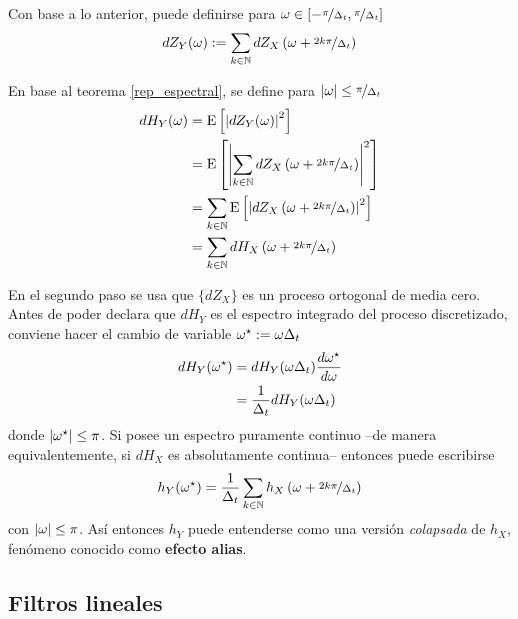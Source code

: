 Con base a lo anterior, puede definirse para 
$\omega \in \left[ -\nicefrac{\pi}{\Delta_t} , \nicefrac{\pi}{\Delta_t} \right]$
\begin{equation}
dZ_Y(\omega) := \sum_{k \in \mathbb{N}} dZ_X\left( \omega + \nicefrac{2 k \pi}{\Delta_t}\right)
\end{equation}

En base al teorema \ref{rep_espectral}, se define para 
$\left| \omega \right| \leq \nicefrac{\pi}{\Delta_t}$
\begin{align}
dH_Y(\omega) &= \mathrm{E}\left[ \left| dZ_Y(\omega) \right|^{2} \right] \nonumber \\
&= \mathrm{E}\left[ \left| \sum_{k \in \mathbb{N}} dZ_X\left( \omega + \nicefrac{2 k \pi}{\Delta_t}\right) \right|^{2} \right]
\nonumber \\
&= \sum_{k \in \mathbb{N}} \mathrm{E}\left[ \left| dZ_X\left( \omega + \nicefrac{2 k \pi}{\Delta_t}\right) \right|^{2} \right]
\nonumber \\
&= \sum_{k \in \mathbb{N}} dH_X\left( \omega + \nicefrac{2 k \pi}{\Delta_t}\right)
\end{align}

En el segundo paso se usa que $\{ dZ_X \}$ es un proceso ortogonal de media cero.
Antes de poder declara que $dH_Y$ es el espectro integrado del proceso discretizado,
conviene hacer el cambio de variable $\omega^{\star} := \omega \Delta_t$
\begin{align*}
dH_Y(\omega^{\star}) &= dH_Y(\omega \Delta_t) \frac{d\omega^{\star}}{d\omega} \\
&= \frac{1}{\Delta_t} dH_Y(\omega \Delta_t)
\end{align*}
donde $\left| \omega^{\star} \right| \leq \pi$.
%
Si \xt posee un espectro puramente continuo --de manera equivalentemente, si $dH_X$ es 
absolutamente continua-- entonces puede escribirse
\begin{equation}
h_Y(\omega^{\star}) = \frac{1}{\Delta_t} \sum_{k \in \mathbb{N}} h_X\left( \omega + \nicefrac{2 k \pi}{\Delta_t}\right)
\end{equation}
con $\left| \omega \right| \leq \pi$. 
%
Así entonces $h_Y$ puede entenderse como una versión \textit{colapsada} de $h_X$, fenómeno conocido 
como \textbf{efecto alias}.


\subsection{Filtros lineales}

